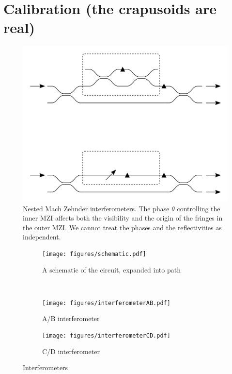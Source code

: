 \section{Calibration (the crapusoids are real)}
\label{sec:Calibration}
\begin{figure}
  \centering
  \includegraphics{figures/crosstalk}
  \caption[Nested Mach Zehnder interferometers]
  {Nested Mach Zehnder interferometers. The phase \(\theta\) controlling the
  inner MZI affects both the visibility and the origin of the fringes in the
  outer MZI. We cannot treat the phases and the reflectivities as independent.}
  \label{fig:nestedMZI}
\end{figure}

\begin{figure}
  \centering
  \begin{subfigure}{\textwidth}
    \texttt{[image: figures/schematic.pdf]}
    \caption{A schematic of the circuit, expanded into path}
    \label{fig:schematic}
  \end{subfigure} \\
  \vspace{1cm}
  \begin{subfigure}{0.45\textwidth}
    \texttt{[image: figures/interferometerAB.pdf]}
    \caption{A/B interferometer}
    \label{fig:ab}
  \end{subfigure}
  \hspace{0.05\textwidth}
  \begin{subfigure}{0.45\textwidth}
    \texttt{[image: figures/interferometerCD.pdf]}
    \caption{C/D interferometer}
    \label{fig:cd}
  \end{subfigure}
  \caption[Illustration of nested interferometers in the bulk Reck scheme]
  {Interferometers}
  \label{fig:interferometers}
\end{figure}

